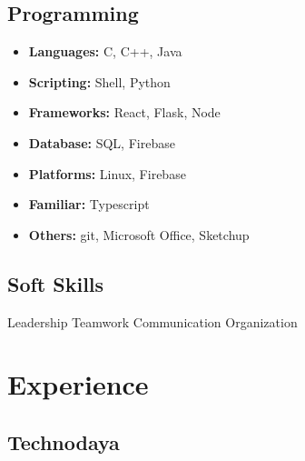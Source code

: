 \documentclass[]{article}
\begin{document}
\begin{multicols}{2}
\begin{flushleft}
    \subsection*{Programming}
    \begin{itemize}
      \item \textbf{Languages:} C, C++, Java
      \item \textbf{Scripting:} Shell, Python
      \item \textbf{Frameworks:} React, Flask, Node
      \item \textbf{Database:} SQL, Firebase
      \item \textbf{Platforms:} Linux, Firebase
      \item \textbf{Familiar:} Typescript
      \item \textbf{Others:} git, Microsoft Office, Sketchup
    \end{itemize}

    \subsection*{Soft Skills}
    Leadership \textbullet{} Teamwork \textbullet{} Communication \textbullet{} Organization

    \section*{Experience}
    \subsection*{Technodaya}
  \end{flushleft}

  

\end{multicols}
\end{document}
